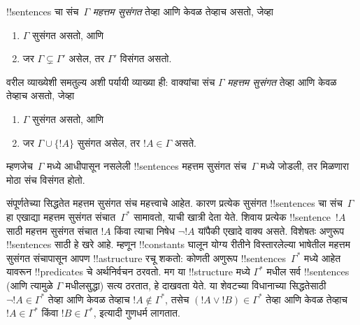 \documentclass[../../../include/open-logic-section]{subfiles}
\begin{document}

\begin{defn}[महत्तम सुसंगत संच]
!!{sentence}s चा संच~$\Gamma$ \emph{महत्तम सुसंगत} तेव्हा आणि केवळ तेव्हाच असतो, जेव्हा
\begin{enumerate}
\item $\Gamma$ सुसंगत असतो, आणि
\item जर $\Gamma \subsetneq \Gamma'$ असेल, तर $\Gamma'$ विसंगत असतो.
\end{enumerate}
\end{defn}

\begin{explain}
वरील व्याख्येशी समतुल्य अशी पर्यायी व्याख्या ही: वाक्यांचा संच $\Gamma$
\emph{महत्तम सुसंगत} तेव्हा आणि केवळ तेव्हाच असतो, जेव्हा
\begin{enumerate}
\item $\Gamma$ सुसंगत असतो, आणि
\item जर $\Gamma \cup \{ !A \}$ सुसंगत असेल, तर $!A \in \Gamma$ असते.
\end{enumerate}
म्हणजेच~$\Gamma$ मध्ये आधीपासून नसलेली !!{sentence}s महत्तम सुसंगत
संच~$\Gamma$ मध्ये जोडली, तर मिळणारा मोठा संच विसंगत होतो.
\end{explain}

\begin{explain}
संपूर्णतेच्या सिद्धतेत महत्तम सुसंगत संच महत्त्वाचे आहेत. कारण प्रत्येक
सुसंगत !!{sentence}s चा संच~$\Gamma$ हा एखाद्या महत्तम सुसंगत
संचात~$\Gamma^*$ सामावतो, याची खात्री देता येते. शिवाय प्रत्येक
!!{sentence}~$!A$ साठी महत्तम सुसंगत संचात $!A$ किंवा त्याचा
निषेध $ \lnot !A$ यांपैकी एखादे वाक्य असते. विशेषतः अणुरूप !!{sentence}s साठी हे खरे
आहे. म्हणून !!{constant}s घालून योग्य रीतीने विस्तारलेल्या भाषेतील
महत्तम सुसंगत संचापासून आपण !!a{structure} रचू शकतो: कोणती अणुरूप
!!{sentence}s~$\Gamma^*$ मध्ये आहेत यावरून !!{predicate}s चे
अर्थनिर्वचन ठरवतो. मग या !!{structure} मध्ये $\Gamma^*$ मधील
सर्व !!{sentence}s (आणि त्यामुळे $\Gamma$ मधीलसुद्धा) सत्य ठरतात,
हे दाखवता येते. या शेवटच्या विधानाच्या सिद्धतेसाठी
$\lnot !A \in \Gamma^*$ तेव्हा आणि केवळ तेव्हाच $!A \notin
\Gamma^*$, तसेच $(!A \lor !B) \in \Gamma^*$ तेव्हा आणि केवळ तेव्हाच
$!A \in \Gamma^*$ किंवा $!B \in \Gamma^*$, इत्यादी गुणधर्म लागतात.
\end{explain}
\end{document}
